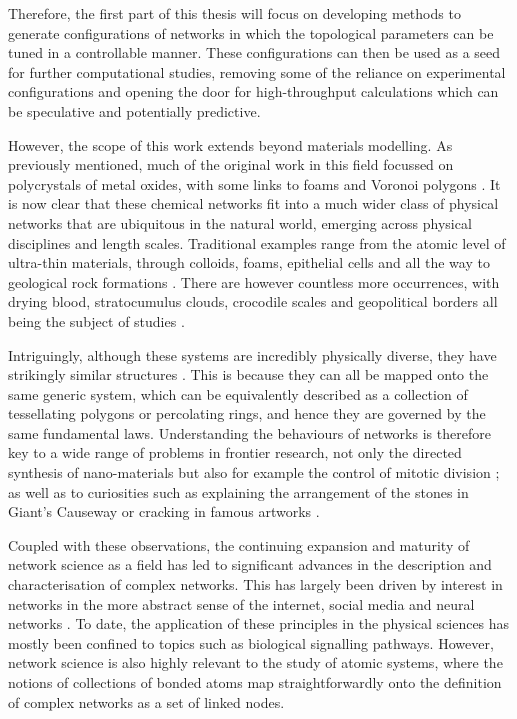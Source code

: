 Therefore, the first part of this thesis will focus on developing methods to generate configurations of \td{} networks in which the topological parameters can be tuned in a controllable manner.
These configurations can then be used as a seed for further computational studies, removing some of the reliance on experimental configurations and opening the door for high\--throughput calculations which can be speculative and potentially predictive.

However, the scope of this work extends beyond materials modelling.
As previously mentioned, much of the original work in this field focussed on polycrystals of metal oxides, with some links to foams and Voronoi polygons \cite{Aboav1980,Boots1984}.
It is now clear that these chemical networks fit into a much wider class of \td{} physical networks that are ubiquitous in the natural world, emerging across physical disciplines and length scales.
Traditional examples range from the atomic level of ultra\--thin materials, through colloids, foams, epithelial cells and all the way to geological rock formations \cite{Earnshaw1994,Allain1995,Moncho-Jorda2000,Durand2011,Tong2017,Goehring2014}.
There are however countless more occurrences, with drying blood, stratocumulus clouds, crocodile scales and geopolitical borders all being the subject of studies \cite{Brutin2011,Glassmeier2017,Milinkovitch2019,LeCaer1993}.

Intriguingly, although these systems are incredibly physically diverse, they have strikingly similar structures \cite{Schliecker1999}. 
This is because they can all be mapped onto the same generic system, which can be equivalently described as a collection of tessellating polygons or percolating rings, and hence they are governed by the same fundamental laws. 
Understanding the behaviours of \td{} networks is therefore key to a wide range of problems in frontier research, not only the directed synthesis of nano\--materials but also for example the control of mitotic division \cite{Gibson2011,Ladan2019}; as well as to curiosities such as explaining the arrangement of the stones in Giant's Causeway or cracking in famous artworks \cite{Weaire1984,Flores2017}.

Coupled with these observations, the continuing expansion and maturity of network science as a field has led to significant advances in the description and characterisation of complex networks.
This has largely been driven by interest in networks in the more abstract sense of the internet, social media and neural networks \cite{Strogatz2001,Boccaletti2006,Barabasi2012}.
To date, the application of these principles in the physical sciences has mostly been confined to topics such as biological signalling pathways.
However, network science is also highly relevant to the study of atomic systems, where the notions of collections of bonded atoms map straightforwardly onto the definition of complex networks as a set of linked nodes.

